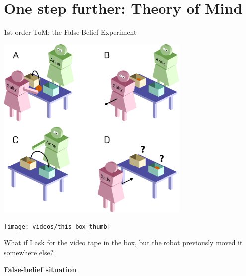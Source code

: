 \documentclass[compress,xcolor=table]{beamer}
\begin{document}
\section[Theory of Mind]{One step further: Theory of Mind}
%
{ \paper{Wimmer and Perner, {\bf Beliefs about beliefs: Representation and
constraining function [...]}, Cognition, 1983]%
}
\begin{frame}{1st order ToM: the False-Belief Experiment}

        \begin{center} 
            \includegraphics[width=0.7\textwidth]{sally_ann.pdf}
        \end{center}
\end{frame}
}

\begin{frame}[plain]

    \begin{center}
        \texttt{[image: videos/this\_box\_thumb]}

        What if I ask for the video tape in the box, but the robot previously
        moved it somewhere else?


    \pause

        {\bf False-belief situation}
    \end{center}
\end{frame}

\end{document}
